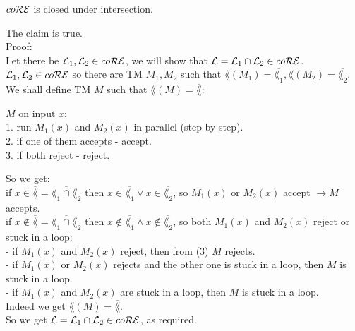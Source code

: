 $co\mathcal{R}\mathcal{E}$ is closed under intersection.

The claim is true. \\

Proof: \\
Let there be $\mathcal{L}_1, \mathcal{L}_2 \in co\mathcal{R}\mathcal{E}$, we will show that $\mathcal{L} = \mathcal{L}_1 \cap \mathcal{L}_2 \in co\mathcal{R}\mathcal{E}$. \\
$\mathcal{L}_1, \mathcal{L}_2 \in co\mathcal{R}\mathcal{E}$ so there are TM $M_1, M_2$ such that
$\lang(M_1) = \overline{\lang_1}, \lang(M_2) = \overline{\lang_2}$. \\
We shall define TM $M$ such that $\lang(M) = \overline{\lang}$:

$M \text{ on input } x$: \\
1. run $M_1(x)$ and $M_2(x)$ in parallel (step by step). \\
2. if one of them accepts - accept. \\
3. if both reject - reject.

So we get: \\
if $x \in \overline{\lang} = \overline{\lang_1 \cap \lang_2}$ then
$x \in \overline{\lang_1} \vee x \in \overline{\lang_2}$, so $M_1(x)$ or $M_2(x)$ accept $\rightarrow M$ accepts. \\
if $x \notin \overline{\lang} = \overline{\lang_1 \cap \lang_2}$  then
$x \notin \overline{\lang_1} \wedge x \notin \overline{\lang_2}$, so both $M_1(x)$ and $M_2(x)$ reject or stuck in a loop: \\
- if $M_1(x)$ and $M_2(x)$ reject, then from (3) $M$ rejects. \\
- if $M_1(x)$ or $M_2(x)$ rejects and the other one is stuck in a loop, then  $M$ is stuck in a loop. \\
- if $M_1(x)$ and $M_2(x)$ are stuck in a loop, then  $M$ is stuck in a loop. \\

Indeed we get $\lang(M) = \overline{\lang}$. \\
So we get $\mathcal{L} = \mathcal{L}_1 \cap \mathcal{L}_2 \in co\mathcal{R}\mathcal{E}$, as required. \\

